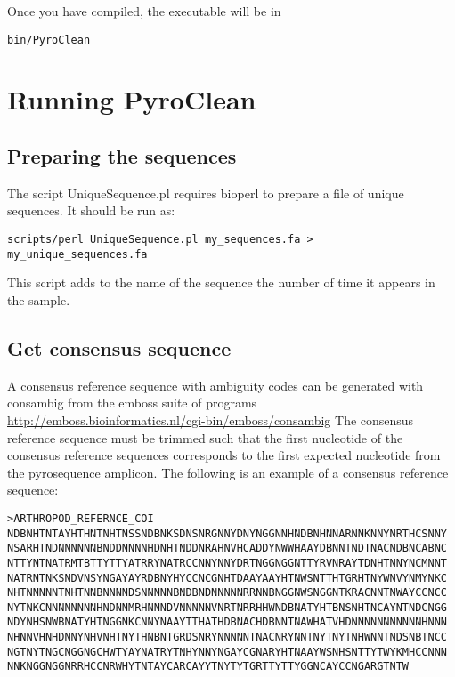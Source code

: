 \documentclass[12pt]{article}
\begin{document}
Once you have compiled, the executable will be in
\begin{verbatim}
bin/PyroClean
\end{verbatim}

\section{Running PyroClean}


\subsection{Preparing the sequences}

The script UniqueSequence.pl  requires bioperl to prepare a file of unique sequences. It should be run as:

\begin{verbatim}
scripts/perl UniqueSequence.pl my_sequences.fa > my_unique_sequences.fa
\end{verbatim}

This script adds to the name of the sequence the number of time it appears in the sample. 

\subsection{Get consensus sequence}

 A consensus reference sequence with ambiguity codes can be generated with consambig from the emboss suite of programs
\url{http://emboss.bioinformatics.nl/cgi-bin/emboss/consambig}
The consensus reference sequence must be trimmed such that the first nucleotide of the consensus reference sequences corresponds to the first expected nucleotide from the pyrosequence amplicon. The following is an example of a consensus reference sequence: 

\begin{verbatim}
>ARTHROPOD_REFERNCE_COI
NDBNHTNTAYHTHNTNHTNSSNDBNKSDNSNRGNNYDNYNGGNNHNDBNHNNARNNKNNYNRTHCSNNY
NSARHTNDNNNNNNBNDDNNNNHDNHTNDDNRAHNVHCADDYNWWHAAYDBNNTNDTNACNDBNCABNC
NTTYNTNATRMTBTTYTTYATRRYNATRCCNNYNNYDRTNGGNGGNTTYRVNRAYTDNHTNNYNCMNNT
NATRNTNKSNDVNSYNGAYAYRDBNYHYCCNCGNHTDAAYAAYHTNWSNTTHTGRHTNYWNVYNMYNKC
NHTNNNNNTNHTNNBNNNNDSNNNNNBNDBNDNNNNNRRNNBNGGNWSNGGNTKRACNNTNWAYCCNCC
NYTNKCNNNNNNNNHNDNNMRHNNNDVNNNNNVNRTNRRHHWNDBNATYHTBNSNHTNCAYNTNDCNGG
NDYNHSNWBNATYHTNGGNKCNNYNAAYTTHATHDBNACHDBNNTNAWHATVHDNNNNNNNNNNNHNNN
NHNNVHNHDNNYNHVNHTNYTHNBNTGRDSNRYNNNNNTNACNRYNNTNYTNYTNHWNNTNDSNBTNCC
NGTNYTNGCNGGNGCHWTYAYNATRYTNHYNNYNGAYCGNARYHTNAAYWSNHSNTTYTWYKMHCCNNN
NNKNGGNGGNRRHCCNRWHYTNTAYCARCAYYTNYTYTGRTTYTTYGGNCAYCCNGARGTNTW
\end{verbatim}
\end{document}
